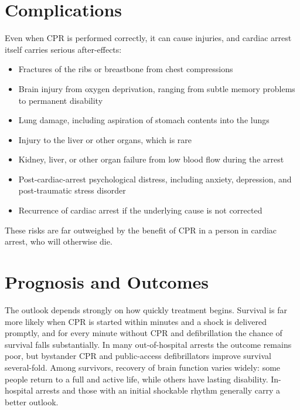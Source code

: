 \section*{Complications}
Even when CPR is performed correctly, it can cause injuries, and cardiac arrest itself carries serious after-effects:
\begin{itemize}
    \item Fractures of the ribs or breastbone from chest compressions
    \item Brain injury from oxygen deprivation, ranging from subtle memory problems to permanent disability
    \item Lung damage, including aspiration of stomach contents into the lungs
    \item Injury to the liver or other organs, which is rare
    \item Kidney, liver, or other organ failure from low blood flow during the arrest
    \item Post-cardiac-arrest psychological distress, including anxiety, depression, and post-traumatic stress disorder
    \item Recurrence of cardiac arrest if the underlying cause is not corrected
\end{itemize}
These risks are far outweighed by the benefit of CPR in a person in cardiac arrest, who will otherwise die.

\section*{Prognosis and Outcomes}
The outlook depends strongly on how quickly treatment begins. Survival is far more likely when CPR is started within minutes and a shock is delivered promptly, and for every minute without CPR and defibrillation the chance of survival falls substantially. In many out-of-hospital arrests the outcome remains poor, but bystander CPR and public-access defibrillators improve survival several-fold. Among survivors, recovery of brain function varies widely: some people return to a full and active life, while others have lasting disability. In-hospital arrests and those with an initial shockable rhythm generally carry a better outlook.


